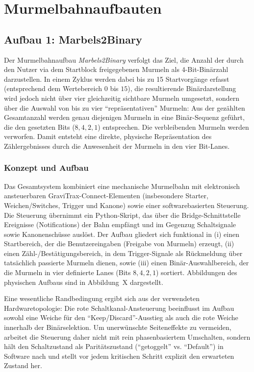 \chapter{Murmelbahnaufbauten}

\section{Aufbau 1: Marbels2Binary}

Der Murmelbahnaufbau \emph{Marbels2Binary} verfolgt das Ziel, die Anzahl der durch den Nutzer via dem Startblock freigegebenen Murmeln als 4-Bit-Binärzahl darzustellen. In einem Zyklus werden dabei bis zu 15 Startvorgänge erfasst (entsprechend dem Wertebereich $0$ bis $15$), die resultierende Binärdarstellung wird jedoch nicht über vier gleichzeitig sichtbare Murmeln umgesetzt, sondern über die Auswahl von bis zu vier ``repräsentativen'' Murmeln: Aus der gezählten Gesamtanzahl werden genau diejenigen Murmeln in eine Binär-Sequenz geführt, die den gesetzten Bits ($8,4,2,1$) entsprechen. Die verbleibenden Murmeln werden verworfen. Damit entsteht eine direkte, physische Repräsentation des Zählergebnisses durch die Anwesenheit der Murmeln in den vier Bit-Lanes.

\subsection{Konzept und Aufbau}
Das Gesamtsystem kombiniert eine mechanische Murmelbahn mit elektronisch ansteuerbaren GraviTrax-Connect-Elementen (insbesondere Starter, Weichen/Switches, Trigger und Kanone) sowie einer softwarebasierten Steuerung. Die Steuerung übernimmt ein Python-Skript, das über die Bridge-Schnittstelle Ereignisse (Notifications) der Bahn empfängt und im Gegenzug Schaltsignale sowie Kanonenschüsse auslöst. Der Aufbau gliedert sich funktional in (i) einen Startbereich, der die Benutzereingaben (Freigabe von Murmeln) erzeugt, (ii) einen Zähl-/Bestätigungsbereich, in dem Trigger-Signale als Rückmeldung über tatsächlich passierte Murmeln dienen, sowie (iii) einen Binär-Auswahlbereich, der die Murmeln in vier definierte Lanes (Bits $8,4,2,1$) sortiert. Abbildungen des physischen Aufbaus sind in Abbildung~X dargestellt.

Eine wesentliche Randbedingung ergibt sich aus der verwendeten Hardwaretopologie: Die rote Schaltkanal-Ansteuerung beeinflusst im Aufbau sowohl eine Weiche für den ``Keep/Discard''-Ausstieg als auch die rote Weiche innerhalb der Binärselektion. Um unerwünschte Seiteneffekte zu vermeiden, arbeitet die Steuerung daher nicht mit rein phasenbasiertem Umschalten, sondern hält den Schaltzustand als Paritätszustand (``getoggelt'' vs. ``Default'') in Software nach und stellt vor jedem kritischen Schritt explizit den erwarteten Zustand her.

